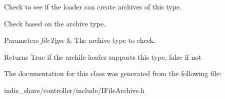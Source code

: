 Check to see if the loader can create archives of this type. 

Check based on the archive type. 
\begin{DoxyParams}{Parameters}
{\em file\+Type} & The archive type to check. \\
\hline
\end{DoxyParams}
\begin{DoxyReturn}{Returns}
True if the archile loader supports this type, false if not 
\end{DoxyReturn}


The documentation for this class was generated from the following file\+:\begin{DoxyCompactItemize}
\item 
indie\+\_\+share/controller/include/I\+File\+Archive.\+h\end{DoxyCompactItemize}
